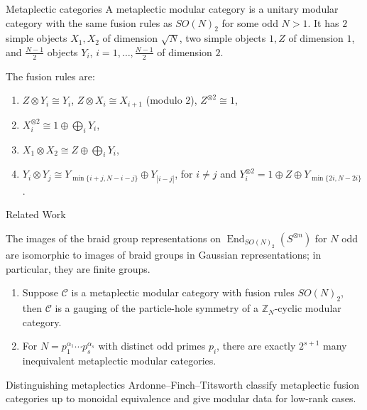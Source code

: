 \documentclass{beamer}
\DeclareMathOperator{\End}{End}
\begin{document}
\newcommand{\one}{1}{

\begin{frame}{Metaplectic categories}
  A metaplectic modular category is a unitary modular category with the same fusion rules as $SO(N)_2$ for some odd $N > 1$. It has $2$ simple objects $X_1, X_2$ of dimension $\sqrt{N}$, two simple objects $\one, Z$ of dimension $1$, and $\frac{N-1}{2}$ objects $Y_i$, $i=1,\ldots,\frac{N-1}{2}$ of dimension $2$.

  The fusion rules are:
\begin{enumerate}
 \item $Z\otimes Y_i\cong Y_i$, $Z\otimes X_i\cong X_{i+1}$ (modulo $2$), $Z^{\otimes 2}\cong\one$,
 \item $X_i^{\otimes 2}\cong \one\oplus \bigoplus_{i} Y_i$,
 \item $X_1\otimes X_2\cong Z\oplus\bigoplus_{i} Y_i$,
 \item $Y_i\otimes Y_j\cong Y_{\min\{i+j,N-i-j\}}\oplus Y_{|i-j|}$, for $i\neq j$ and $Y_i^{\otimes 2}=\one\oplus Z\oplus Y_{\min\{2i,N-2i\}}$.
\end{enumerate}

\end{frame}


\begin{frame}{Related Work}
\begin{theorem}
The images of the braid group representations on $\End_{SO(N)_2}(S^{\otimes n})$ for $N$ odd are isomorphic to images of braid groups in Gaussian representations; in particular, they are finite groups.
\end{theorem}

\begin{theorem}
\begin{enumerate}
\item Suppose $\mathcal{C}$ is a metaplectic modular category with fusion rules $SO(N)_2$, then $\mathcal{C}$ is a gauging of the particle-hole symmetry of a $\mathbb{Z}_N$-cyclic modular category.
\item For $N=p_1^{\alpha_1}\cdots p_s^{\alpha_s}$ with distinct odd primes $p_i$, there are exactly $2^{s+1}$ many inequivalent metaplectic modular categories.
\end{enumerate}
\end{theorem}
\end{frame}


\begin{frame}{Distinguishing metaplectics}
  Ardonne--Finch--Titsworth classify metaplectic fusion categories up to monoidal equivalence and give modular data for low-rank cases.


\end{frame}}
\end{document}
